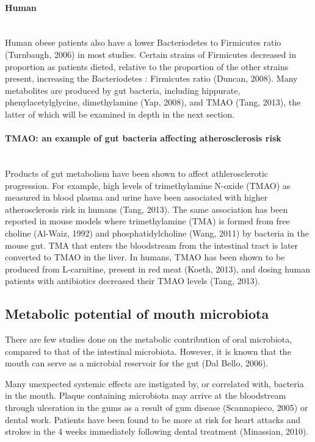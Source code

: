 \paragraph{Human}\mbox{}\\
Human obese patients also have a lower Bacteriodetes to Firmicutes ratio (Turnbaugh, 2006) in most studies. Certain strains of Firmicutes decreased in proportion as patients dieted, relative to the proportion of the other strains present, increasing the Bacteriodetes : Firmicutes ratio (Duncan, 2008). Many metabolites are produced by gut bacteria, including hippurate, phenylacetylglycine, dimethylamine (Yap, 2008), and TMAO (Tang, 2013), the latter of which will be examined in depth in the next section.

\paragraph{TMAO: an example of gut bacteria affecting atherosclerosis risk}\mbox{}\\
[TO DO: ADD TMAO MECHANISM OF ACTION]

Products of gut metabolism have been shown to affect athlerosclerotic progression. For example, high levels of trimethylamine N-oxide (TMAO) as measured in blood plasma and urine have been associated with higher atherosclerosis risk in humans (Tang, 2013). The same association has been reported in mouse models where trimethylamine (TMA) is formed from free choline (Al-Waiz, 1992) and phosphatidylcholine (Wang, 2011) by bacteria in the mouse gut. TMA that enters the bloodstream from the intestinal tract is later converted to TMAO in the liver. In humans, TMAO has been shown to be produced from L-carnitine, present in red meat (Koeth, 2013), and dosing human patients with antibiotics decreased their TMAO levels (Tang, 2013).

\subsection{Metabolic potential of mouth microbiota}
There are few studies done on the metabolic contribution of oral microbiota, compared to that of the intestinal microbiota. However, it is known that the mouth can serve as a microbial reservoir for the gut (Dal Bello, 2006).

Many unexpected systemic effects are instigated by, or correlated with, bacteria in the mouth. Plaque containing microbiota may arrive at the bloodstream through ulceration in the gums as a result of gum disease (Scannapieco, 2005) or dental work. Patients have been found to be more at risk for heart attacks and strokes in the 4 weeks immediately following dental treatment (Minassian, 2010).

